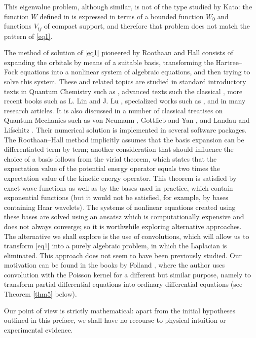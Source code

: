 \documentclass[english, reqno]{amsart}
\begin{document}
This eigenvalue problem, although similar, is not of the type studied by Kato: the function $W$ defined in \cite[(2.2)]{Ka} is expressed in terms of a bounded function $W_0$ and functions $V_{ij}$ of compact support, and therefore that problem does not match the pattern of \eqref{eq1}.

The method of solution of \eqref{eq1} pioneered by Roothaan and Hall consists of expanding the orbitals by means of a suitable basis, transforming the Hartree--Fock equations into a nonlinear system of algebraic equations, and then trying to solve this system. These and related topics are studied in standard introductory texts in Quantum Chemistry such as \cite{IL,SO}, advanced texts such the classical \cite{MS, Ra}, more recent books such as L. Lin and J. Lu \cite{LL2}, specialized works such as \cite{Da},
and in many research articles.  It is also discussed in a number of classical treatises on Quantum Mechanics such as von Neumann \cite{vN}, Gottlieb and Yan \cite{GY}, and Landau and Lifschitz \cite{LL}. Their numerical solution is implemented in several software packages.
The Roothaan--Hall  method implicitly assumes that the basis expansion can be differentiated term by term; another consideration that should influence the choice of a basis follows from the virial theorem, which states that the expectation value of the potential energy operator equals two times the expectation value of the kinetic energy operator. This theorem is satisfied by exact wave functions as well as by the bases used in practice, which contain exponential functions (but it would not be satisfied, for example, by bases containing Haar wavelets). The systems of nonlinear equations created using these bases  are solved using an ansatsz which is computationally expensive and does not always converge; so it is worthwhile exploring alternative approaches. 
The alternative we shall explore is the use of convolutions, which will allow us to transform \eqref{eq1} into a purely algebraic problem, in which the Laplacian is eliminated. This approach does not seem to have been previously studied. Our motivation can be found in the books by Folland \cite{Fo, Fo1}, where the author uses convolution with the Poisson kernel for a different but similar purpose, namely to transform partial differential equations into ordinary differential equations (see Theorem \ref{thm5} below).

Our point of view is strictly mathematical: apart from the initial hypotheses outlined in this preface, we shall have no recourse to physical intuition or experimental evidence. 
\end{document}
